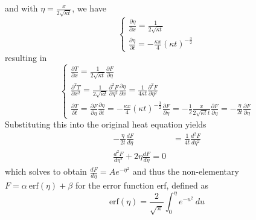 \documentclass{article}
\begin{document}
and with $\eta = \frac{x}{2\sqrt{\kappa t}}$, we have 
\begin{equation*}
    \begin{cases}
        \frac{\partial \eta}{\partial x} = \frac{1}{2\sqrt{\kappa t}} \\
        \frac{\partial \eta}{\partial t} = -\frac{\kappa x}{4}(\kappa t)^{-\frac{3}{2}}
    \end{cases}
\end{equation*}
resulting in
\begin{equation*}
    \begin{cases}
        \frac{\partial T}{\partial x} = \frac{1}{2\sqrt{\kappa t}}\frac{\partial F}{\partial \eta} \\
        \frac{\partial^2 T}{\partial x^2} = \frac{1}{2\sqrt{\kappa t}}\frac{\partial^2 F}{\partial \eta^2} \frac{\partial \eta}{\partial x} = \frac{1}{4\kappa t}\frac{\partial^2 F}{\partial \eta^2} \\
        \frac{\partial T}{\partial t} = \frac{\partial F}{\partial \eta} \frac{\partial \eta}{\partial t} = -\frac{\kappa x}{4}(\kappa t)^{-\frac{3}{2}}\frac{\partial F}{\partial \eta} = -\frac{1}{2}\frac{x}{2\sqrt{\kappa t}t}\frac{\partial F}{\partial \eta} = -\frac{\eta}{2t}\frac{\partial F}{\partial \eta}
    \end{cases}
\end{equation*}
Substituting this into the original heat equation yields
\begin{equation*}
    \begin{aligned}
        -\frac{\eta}{2t}\frac{dF}{d\eta}&=\frac{1}{4t}\frac{d^2F}{d\eta^2} \\
        \frac{d^2F}{d\eta^2}+2\eta\frac{dF}{d\eta}=0
    \end{aligned}
\end{equation*}
which solves to obtain $\frac{dF}{d\eta} = Ae^{-\eta^2}$ and thus the non-elementary $F=\alpha\ \text{erf}(\eta) + \beta$ for the error function erf, defined as 
\begin{equation*}
    \text{erf}(\eta)=\frac{2}{\sqrt{\pi}}\int_{0}^{\eta}e^{-u^2}\ du
\end{equation*}
\end{document}
